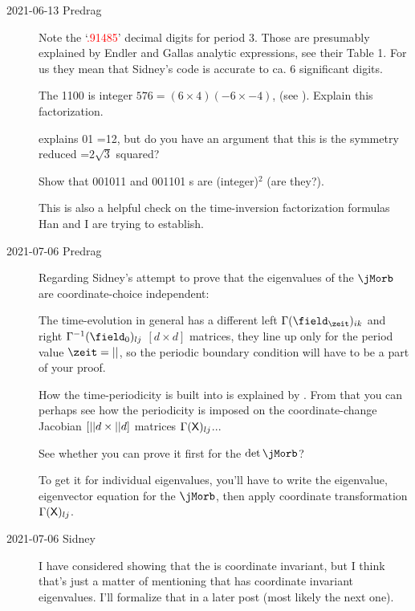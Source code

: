 \begin{description}
\item[2021-06-13 Predrag]
Note the `\textcolor{red}{.91485}' decimal digits for period 3. Those are
presumably explained by Endler and Gallas analytic expressions, see
their Table 1. For us they mean that Sidney's code is accurate to ca. 6
significant digits.

The 1100 {\HillDet} is integer $576=(6\times4)(-6\times-4)$,
(see ). Explain this factorization.

explains 01 {\HillDet}=12, but do you have an argument that this
is the symmetry reduced {\HillDet}=$2\sqrt{3}$ squared?

Show that 001011 and 001101
{\HillDet}s are (integer)$^2$ (are they?).

This is also a helpful check on the
time-inversion factorization formulas Han and I are trying to establish.

\item[2021-07-06 Predrag]
Regarding Sidney's attempt  to prove that the eigenvalues
of the {\jacobianOrb} $\jMorb$ are coordinate-choice independent:

The time-evolution {\jacobianM} in general has a different left
$\Gamma(\field_{\zeit})_{ik}$ and right $\Gamma^{-1}(\field_0)_{lj}$
$[d\times{d}]$ matrices, they line up only for the period value
$\zeit=\cl{}$, so the periodic boundary condition will have to be a part of
your proof.

How the time-periodicity is built into {\jacobianOrbs} is explained by
. From that you can perhaps see how the periodicity is
imposed on the coordinate-change Jacobian $[{||}d\times{{\ensuremath{||}}d}]$ matrices
$\Gamma(\mathsf{X})_{lj}$...

See whether you can prove it first for the {\HillDet} $\det{\jMorb}$?

To get it for individual eigenvalues, you'll have to write the eigenvalue,
eigenvector equation for the {\jacobianOrb} $\jMorb$, then apply coordinate
transformation $\Gamma(\mathsf{X})_{lj}$.

\item[2021-07-06 Sidney]
I have considered showing that the {\HillDet} is coordinate invariant, but I
think that's just a matter of mentioning that {\jacobianM} has coordinate
invariant eigenvalues. I'll formalize that in a later post (most likely the
next one).


\end{description}
